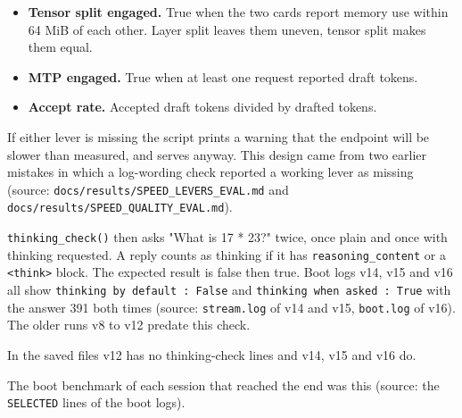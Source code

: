 \begin{itemize}[leftmargin=*, itemsep=2pt]
\item \textbf{Tensor split engaged.} True when the two cards report memory use within 64 MiB of each other. Layer split leaves them uneven, tensor split makes them equal.
\item \textbf{MTP engaged.} True when at least one request reported draft tokens.
\item \textbf{Accept rate.} Accepted draft tokens divided by drafted tokens.
\end{itemize}

If either lever is missing the script prints a warning that the endpoint will be slower than measured, and serves anyway. This design came from two earlier mistakes in which a log-wording check reported a working lever as missing (source: \texttt{docs/\allowbreak{}results/\allowbreak{}SPEED\_\allowbreak{}LEVERS\_\allowbreak{}EVAL.\allowbreak{}md} and \texttt{docs/\allowbreak{}results/\allowbreak{}SPEED\_\allowbreak{}QUALITY\_\allowbreak{}EVAL.\allowbreak{}md}).

\texttt{thinking\_\allowbreak{}check()} then asks "What is 17 * 23?" twice, once plain and once with thinking requested. A reply counts as thinking if it has \texttt{reasoning\_\allowbreak{}content} or a \texttt{\textless{}think\textgreater{}} block. The expected result is false then true. Boot logs v14, v15 and v16 all show \texttt{thinking by default :\allowbreak{} False} and \texttt{thinking when asked :\allowbreak{} True} with the answer 391 both times (source: \texttt{stream.\allowbreak{}log} of v14 and v15, \texttt{boot.\allowbreak{}log} of v16). The older runs v8 to v12 predate this check.

In the saved files v12 has no thinking-check lines and v14, v15 and v16 do.

The boot benchmark of each session that reached the end was this (source: the \texttt{SELECTED} lines of the boot logs).

